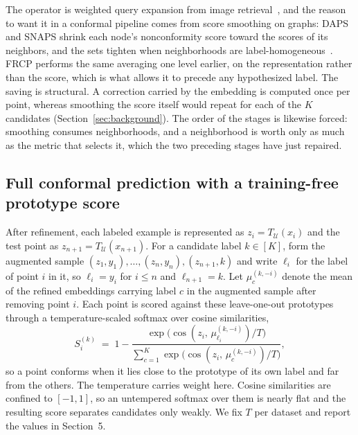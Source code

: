 The operator is weighted query expansion from image
retrieval~\citep{radenovic2019finetuning}, and the reason to want it in
a conformal pipeline comes from score smoothing on graphs: DAPS and
SNAPS shrink each node's nonconformity score toward the scores of its
neighbors, and the sets tighten when neighborhoods are
label-homogeneous~\citep{zargarbashi2023conformal, song2024similarity}.
FRCP performs the same averaging one level earlier, on the
representation rather than the score, which is what allows it to
precede any hypothesized label. The saving is structural. A correction
carried by the embedding is computed once per point, whereas smoothing
the score itself would repeat for each of the $K$ candidates
(Section~\ref{sec:background}). The order of the stages is likewise
forced: smoothing consumes neighborhoods, and a neighborhood is worth
only as much as the metric that selects it, which the two preceding
stages have just repaired.

\subsection{Full conformal prediction with a training-free prototype score}
\label{sec:fcp}

After refinement, each labeled example is represented as
$z_i = T_{\mathcal{U}}(x_i)$ and the test point as
$z_{n+1} = T_{\mathcal{U}}(x_{n+1})$. For a candidate label
$k \in [K]$, form the augmented sample
$(z_1, y_1), \dots, (z_n, y_n), (z_{n+1}, k)$ and write $\ell_i$ for
the label of point $i$ in it, so $\ell_i = y_i$ for $i \le n$ and
$\ell_{n+1} = k$. Let $\mu^{(k, -i)}_{c}$ denote the mean of the
refined embeddings carrying label $c$ in the augmented sample after
removing point $i$. Each point is scored against these leave-one-out
prototypes through a temperature-scaled softmax over cosine
similarities,
\begin{equation}
\label{eq:score}
S^{(k)}_{i} \;=\;
1 - \frac{\exp\bigl(\cos(z_i,\, \mu^{(k,-i)}_{\ell_i}) / T\bigr)}
         {\sum_{c=1}^{K} \exp\bigl(\cos(z_i,\, \mu^{(k,-i)}_{c}) / T\bigr)} ,
\end{equation}
so a point conforms when it lies close to the prototype of its own
label and far from the others. The temperature carries weight here.
Cosine similarities are confined to $[-1, 1]$, so an untempered
softmax over them is nearly flat and the resulting score separates
candidates only weakly. We fix $T$ per dataset and report the values
in Section~5.

